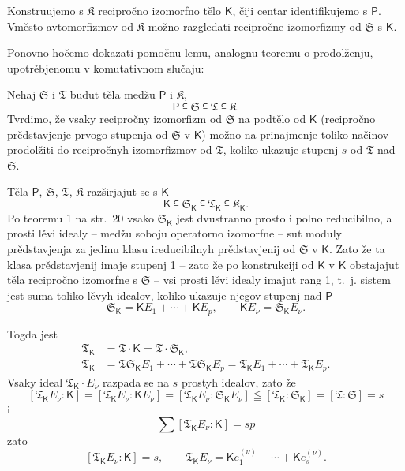 \documentclass[11pt]{article}
\begin{document}
Konstruujemo s \(\mathfrak K\) recipročno izomorfno tělo \(\mathsf{K}\), čiji centar identifikujemo s \(\mathsf P\). Vměsto avtomorfizmov od \(\mathfrak K\) možno razgledati recipročne izomorfizmy od \(\mathfrak S\) s \(\mathsf{K}\).

Ponovno hočemo dokazati pomočnu lemu, analognu teoremu o prodolženju, upotrěbjenomu v komutativnom slučaju:

Nehaj \(\mathfrak S\) i \(\mathfrak T\) budut těla medžu \(\mathsf P\) i \(\mathfrak K\),
\[
\mathsf P \subseteqq \mathfrak S \subseteqq \mathfrak T \subseteqq \mathfrak K.
\]
Tvrdimo, že vsaky recipročny izomorfizm od \(\mathfrak S\) na podtělo od \(\mathsf{K}\) (recipročno prědstavjenje prvogo stupenja od \(\mathfrak S\) v \(\mathsf{K}\)) možno na prinajmenje toliko načinov prodolžiti do recipročnyh izomorfizmov od \(\mathfrak T\), koliko ukazuje stupenj \(s\) od \(\mathfrak T\) nad \(\mathfrak S\).

Těla \(\mathsf P\), \(\mathfrak S\), \(\mathfrak T\), \(\mathfrak K\) razširjajut se s \(\mathsf{K}\)
\[
\mathsf{K}\subseteqq \mathfrak S_{\mathsf{K}}\subseteqq \mathfrak T_{\mathsf{K}}\subseteqq \mathfrak K_{\mathsf{K}}.
\]
Po teoremu 1 na str.~20 vsako \(\mathfrak S_{\mathsf{K}}\) jest dvustranno prosto i polno reducibilno, a prosti lěvi idealy -- medžu soboju operatorno izomorfne -- sut moduly prědstavjenja za jedinu klasu ireducibilnyh prědstavjenij od \(\mathfrak S\) v \(\mathsf{K}\). Zato že ta klasa prědstavjenij imaje stupenj 1 -- zato že po konstrukciji od \(\mathsf{K}\) v \(\mathsf{K}\) obstajajut těla recipročno izomorfne s \(\mathfrak S\) -- vsi prosti lěvi idealy imajut rang 1, t.~j. sistem jest suma toliko lěvyh idealov, koliko ukazuje njegov stupenj nad \(\mathsf P\)
\[
\mathfrak S_{\mathsf{K}}=\mathsf K E_1+\cdots+\mathsf K E_p,\qquad \mathsf K E_\nu=\mathfrak S_{\mathsf{K}} E_\nu.
\]

Togda jest
\[
\begin{aligned}
\mathfrak T_{\mathsf{K}}&=\mathfrak T\cdot \mathsf{K}=\mathfrak T\cdot \mathfrak S_{\mathsf{K}},\\
\mathfrak T_{\mathsf{K}}&=\mathfrak T\mathfrak S_{\mathsf{K}} E_1+\cdots+\mathfrak T\mathfrak S_{\mathsf{K}} E_p
              =\mathfrak T_{\mathsf{K}} E_1+\cdots+\mathfrak T_{\mathsf{K}} E_p.
\end{aligned}
\]
Vsaky ideal \(\mathfrak T_{\mathsf{K}}\cdot E_\nu\) razpada se na \(s\) prostyh idealov, zato že
\[
[\mathfrak T_{\mathsf{K}} E_\nu:\mathsf{K}]=[\mathfrak T_{\mathsf{K}} E_\nu:\mathsf K E_\nu]=[\mathfrak T_{\mathsf{K}} E_\nu:\mathfrak S_{\mathsf{K}} E_\nu]\leqq[\mathfrak T_{\mathsf{K}}:\mathfrak S_{\mathsf{K}}]=[\mathfrak T:\mathfrak S]=s
\]
i
\[
\sum [\mathfrak T_{\mathsf{K}} E_\nu:\mathsf{K}]=sp
\]
zato
\[
[\mathfrak T_{\mathsf{K}} E_\nu:\mathsf{K}]=s,
\qquad
\mathfrak T_{\mathsf{K}} E_\nu=\mathsf K e_1^{(\nu)}+\cdots+\mathsf K e_s^{(\nu)}.
\]
\end{document}
